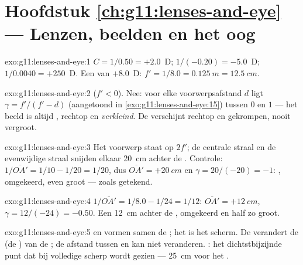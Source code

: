 \section*{Hoofdstuk \ref{ch:g11:lenses-and-eye} --- Lenzen, beelden en het oog}

\begin{solution}{exo:g11:lenses-and-eye:1}
$C = 1/0.50 = +2.0$~D; $1/(-0.20) = -5.0$~D; $1/0.0040 = +250$~D. Een
 van $+8.0$~D: $f' = 1/8.0 = \qty{0.125}{m} = \qty{12.5}{cm}$.
\end{solution}

\begin{solution}{exo:g11:lenses-and-eye:2}
 ($f' < 0$). Nee: voor elke voorwerpsafstand $d$ ligt
$\gamma = f'/(f' - d)$ (aangetoond in
\cref{exo:g11:lenses-and-eye:15}) tussen $0$ en $1$ --- het beeld is
altijd , rechtop en \emph{verkleind}. De  verschijnt rechtop
en gekrompen, nooit vergroot.
\end{solution}

\begin{solution}{exo:g11:lenses-and-eye:3}
Het voorwerp staat op $2f'$; de centrale straal en de evenwijdige straal
snijden elkaar \qty{20}{cm} achter de . Controle:
$1/\overline{OA'} = 1/10 - 1/20 = 1/20$, dus
$\overline{OA'} = +\qty{20}{cm}$ en $\gamma = 20/(-20) = -1$: ,
omgekeerd, even groot --- zoals getekend.
\end{solution}

\begin{solution}{exo:g11:lenses-and-eye:4}
$1/\overline{OA'} = 1/8.0 - 1/24 = 1/12$:
$\overline{OA'} = +\qty{12}{cm}$, $\gamma = 12/(-24) = -0.50$. Een  \qty{12}{cm} achter de , omgekeerd en half zo groot.
\end{solution}

\begin{solution}{exo:g11:lenses-and-eye:5}
 en  vormen samen de ; het  is
het scherm. De  verandert de  (de
) van de ; de afstand tussen  en  kan niet
veranderen. : het dichtstbijzijnde punt dat bij volledige
 scherp wordt gezien --- \qty{25}{cm} voor het .
\end{solution}

